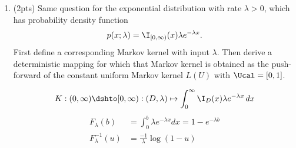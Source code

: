 \begin{enumerate}
\begin{gradedsolution}
    \end{gradedsolution}
  \item (2pts) Same question for the exponential distribution with rate $\lambda > 0$, which has probability density function 
    $$p(x;\lambda) = \I_{[0,\infty)}(x) \lambda e^{-\lambda x}.$$
    First define a corresponding Markov kernel with input $\lambda$. Then derive a deterministic mapping for which that Markov kernel is obtained as the push-forward of the constant uniform Markov kernel $L(U)$ with $\Ucal = [0,1]$.

  \begin{gradedsolution}
    $$K : (0,\infty) \dshto [0,\infty) : (D,\lambda) \mapsto \int_0^\infty \I_D(x) \lambda e^{-\lambda x} \,dx$$
    \begin{align*}
      F_\lambda(b)&=\int_0^b \lambda e^{-\lambda x} dx = 1-e^{-\lambda b}\\
      F_\lambda^{-1}(u)&=\frac{-1}{\lambda}\log(1-u)
    \end{align*}
  \end{gradedsolution}

\end{enumerate}


